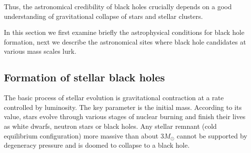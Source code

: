 \documentclass{lamuphys}
\begin{document}
Thus, the astronomical credibility of black holes crucially depends on a good
understanding of gravitational collapse of stars and stellar clusters.

In this section we first examine briefly the astrophysical conditions for 
black hole formation, next we describe the astronomical sites where 
black hole candidates at various mass scales lurk.

\subsection {Formation of stellar black holes}

The basic process of stellar evolution is gravitational contraction at a rate
controlled by luminosity. The key parameter is the initial mass. According to its
value, stars evolve through various stages of nuclear burning and 
finish their lives as white
dwarfs, neutron stars or black holes. Any stellar remnant (cold equilibrium configuration)
more massive than about $3 M_{\odot}$ cannot be supported by degeneracy pressure and
is doomed to collapse to a black hole. 
\end{document}
